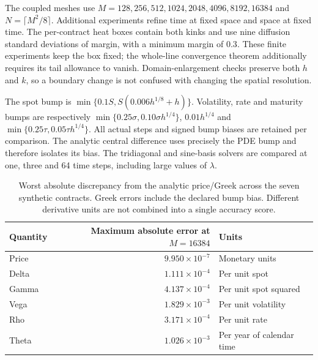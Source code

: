 \documentclass[11pt]{article}
\begin{document}
The coupled meshes use $M=128,256,512,1024,2048,4096,8192,16384$ and
$N=\lceil M^2/8\rceil$. Additional experiments refine time at fixed space
and space at fixed time. The per-contract heat boxes contain both kinks
and use nine diffusion standard deviations of margin, with a minimum
margin of $0.3$. These finite experiments keep the box fixed; the
whole-line convergence theorem additionally requires its tail allowance
to vanish. Domain-enlargement checks preserve both $h$ and $k$, so a
boundary change is not confused with changing the spatial resolution.

The spot bump is
$\min\{0.1S,S(0.006h^{1/8}+h)\}$.
Volatility, rate and maturity bumps are respectively
$\min\{0.25\sigma,0.10\sigma h^{1/4}\}$,
$0.01h^{1/4}$ and
$\min\{0.25\tau,0.05\tau h^{1/4}\}$.
All actual steps and signed bump biases are retained per comparison.
The analytic central difference uses precisely the PDE bump and therefore
isolates its bias. The tridiagonal and sine-basis solvers are compared
at one, three and 64 time steps, including large values of $\lambda$.

\begin{table}[tb]\centering\small
\begin{tabular}{lrl}\toprule
Quantity & Maximum absolute error at $M=16384$ & Units\\\midrule
Price & $9.950\!\times\!10^{-7}$ & Monetary units \\
Delta & $1.111\!\times\!10^{-4}$ & Per unit spot \\
Gamma & $4.137\!\times\!10^{-4}$ & Per unit spot squared \\
Vega & $1.829\!\times\!10^{-3}$ & Per unit volatility \\
Rho & $3.171\!\times\!10^{-4}$ & Per unit rate \\
Theta & $1.026\!\times\!10^{-3}$ & Per year of calendar time \\
\bottomrule\end{tabular}
\caption{Worst absolute discrepancy from the analytic price/Greek across the seven synthetic contracts. Greek errors include the declared bump bias. Different derivative units are not combined into a single accuracy score.}
\label{tab:cgbm-fine-errors}\end{table}
\end{document}
